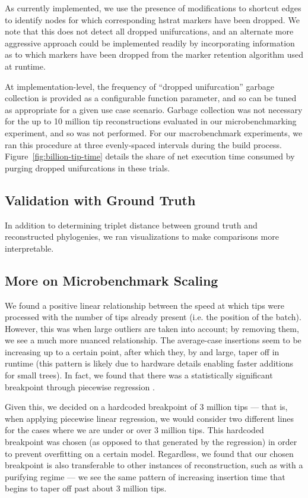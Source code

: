 As currently implemented, we use the presence of modifications to shortcut edges to identify nodes for which corresponding hstrat markers have been dropped.
We note that this does not detect all dropped unifurcations, and an alternate more aggressive approach could be implemented readily by incorporating information as to which markers have been dropped from the marker retention algorithm used at runtime.

At implementation-level, the frequency of ``dropped unifurcation'' garbage collection is provided as a configurable function parameter, and so can be tuned as appropriate for a given use case scenario.
Garbage collection was not necessary for the up to 10 million tip reconstructions evaluated in our microbenchmarking experiment, and so was not performed.
For our macrobenchmark experiments, we ran this procedure at three evenly-spaced intervals during the build process.
Figure~\ref{fig:billion-tip-time} details the share of net execution time consumed by purging dropped unifurcations in these trials.

\subsection{Validation with Ground Truth}

In addition to determining triplet distance between ground truth and reconstructed phylogenies, we ran visualizations to make comparisons more interpretable.



\subsection{More on Microbenchmark Scaling}

We found a positive linear relationship between the speed at which tips were processed with the number of tips already present (i.e. the position of the batch).
However, this was when large outliers are taken into account; by removing them, we see a much more nuanced relationship.
The average-case insertions seem to be increasing up to a certain point, after which they, by and large, taper off in runtime (this pattern is likely due to hardware details enabling faster additions for small trees).
In fact, we found that there was a statistically significant breakpoint through piecewise regression \citep{pilgrim2021piecewise,davies1987hypothesis}.

Given this, we decided on a hardcoded breakpoint of 3 million tips --- that is, when applying piecewise linear regression, we would consider two different lines for the cases where we are under or over 3 million tips.
This hardcoded breakpoint was chosen (as opposed to that generated by the regression) in order to prevent overfitting on a certain model.
Regardless, we found that our chosen breakpoint is also transferable to other instances of reconstruction, such as with a purifying regime --- we see the same pattern of increasing insertion time that begins to taper off past about 3 million tips.

